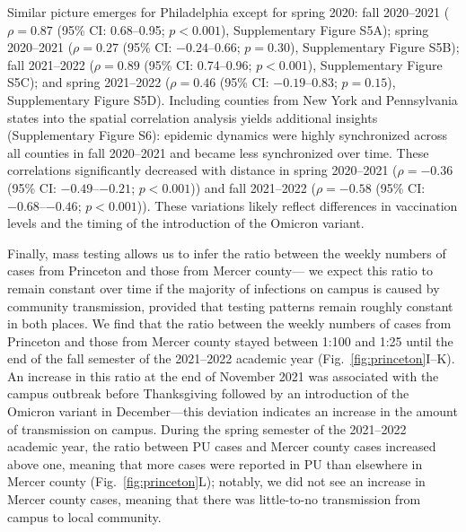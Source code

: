 \documentclass[12pt]{article}
\newcommand{\fref}[1]{Fig.~\ref{fig:#1}}
\begin{document}
Similar picture emerges for Philadelphia except for spring 2020: fall 2020--2021 ($\rho = 0.87$ (95\% CI: 0.68--0.95; $p < 0.001$), Supplementary Figure S5A); spring 2020--2021 ($\rho = 0.27$ (95\% CI: $-0.24$--0.66; $p = 0.30$), Supplementary Figure S5B); fall 2021--2022 ($\rho = 0.89$ (95\% CI: 0.74--0.96; $p < 0.001$), Supplementary Figure S5C); 
and spring 2021--2022 ($\rho=0.46$ (95\% CI: $-0.19$--0.83; $p=0.15$), Supplementary Figure S5D).
Including counties from New York and Pennsylvania states into the spatial correlation analysis yields additional insights (Supplementary Figure S6):
epidemic dynamics were highly synchronized across all counties in fall 2020--2021 and became less synchronized over time. 
These correlations significantly decreased with distance in spring 2020--2021 ($\rho = -0.36$ (95\% CI: $-0.49$--$-0.21$; $p < 0.001$)) and fall 2021--2022 ($\rho = -0.58$ (95\% CI: $-0.68$--$-0.46$; $p < 0.001$)).
These variations likely reflect differences in vaccination levels and the timing of the introduction of the Omicron variant.

Finally, mass testing allows us to infer the ratio between the weekly numbers of cases from Princeton and those from Mercer county---
we expect this ratio to remain constant over time if the majority of infections on campus is caused by community transmission, provided that testing patterns remain roughly constant in both places.
We find that the ratio between the weekly numbers of cases from Princeton and those from Mercer county stayed between 1:100 and 1:25 until the end of the fall semester of the 2021--2022 academic year (\fref{princeton}I--K).
An increase in this ratio at the end of November 2021 was associated with the campus outbreak before Thanksgiving followed by an introduction of the Omicron variant in December---this deviation indicates an increase in the amount of transmission on campus.
During the spring semester of the 2021--2022 academic year, the ratio between PU cases and Mercer county cases increased above one, meaning that more cases were reported in PU than elsewhere in Mercer county (\fref{princeton}L);
notably, we did not see an increase in Mercer county cases, meaning that there was little-to-no transmission from campus to local community.
\end{document}
